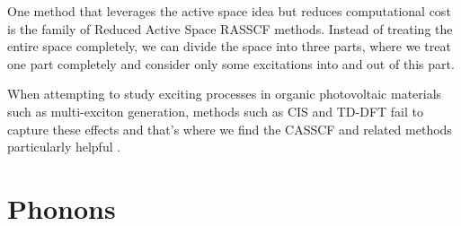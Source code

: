 One method that leverages the active space idea but reduces computational cost is the family of Reduced Active Space RASSCF methods. Instead of treating the entire space completely, we can divide the space into three parts, where we treat one part completely and consider only some excitations into and out of this part.



When attempting to study exciting processes in organic photovoltaic materials such as multi-exciton generation, methods such as CIS and TD-DFT fail to capture these effects and that's where we find the CASSCF and related methods particularly helpful \cite{zimmerman2013correlated}.




\section{Phonons}







